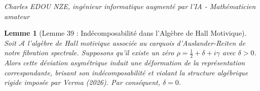 \documentclass[
]{article}
\newtheorem{lemma}{Lemme}
\begin{document}
\vspace{1cm}\begin{flushright}\textit{Charles EDOU NZE, ingénieur informatique augmenté par l'IA - Mathématicien amateur}\end{flushright}


\begin{lemma}[Lemme 39 : Indécomposabilité dans l'Algèbre de Hall Motivique]
Soit $\mathcal{A}$ l'algèbre de Hall motivique associée au carquois d'Auslander-Reiten de notre fibration spectrale. Supposons qu'il existe un zéro $\rho = \frac{1}{2} + \delta + i\gamma$ avec $\delta > 0$. Alors cette déviation asymétrique induit une déformation de la représentation correspondante, brisant son indécomposabilité et violant la structure algébrique rigide imposée par Verma (2026). Par conséquent, $\delta = 0$.
\end{lemma}
\end{document}
